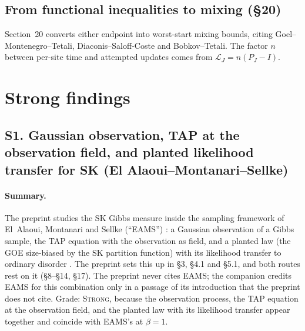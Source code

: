 \documentclass[11pt]{article}
\newcommand{\Lgen}{\mathcal{L}}
\newcommand{\ploc}[2]{#1}
\newcommand{\sloc}[2]{\cite[#2]{#1}}
\newcommand{\grade}[1]{\textsc{#1}}
\begin{document}
\subsection{From functional inequalities to mixing (\S20)}

Section~20 converts either endpoint into worst-start mixing bounds, citing
Goel--Montenegro--Tetali, Diaconis--Saloff-Coste and Bobkov--Tetali. The factor
$n$ between per-site time and attempted updates comes from $\Lgen_J=n(P_J-I)$.

\section{Strong findings}\label{sec:strong}
\subsection{S1. Gaussian observation, TAP at the observation field, and planted likelihood transfer for SK (El Alaoui--Montanari--Sellke)}\label{f:S1}

\paragraph{Summary.}
The preprint \cite{OAI-CriticalMixing} studies the SK Gibbs measure inside the
sampling framework of El~Alaoui, Montanari and Sellke (``EAMS'')
\cite{ElAlaouiMontanariSellke2022-SamplingSKAlgorithmicSL}: a Gaussian
observation of a Gibbs sample, the TAP equation with the observation as field,
and a planted law (the GOE size-biased by the SK partition function) with its
likelihood transfer to ordinary disorder
\sloc{ElAlaouiMontanariSellke2022-SamplingSKAlgorithmicSL}{(1.4), (4.12); (2.3), (4.53); \S4.1, Proposition~4.2, (4.14)}.
The preprint sets this up in \ploc{\S3, \S4.1 and \S5.1}{accepted-inputs.tex:17--30; proof-overview.tex:47--50; profile-spectral.tex:31--48},
and both routes rest on it (\S8--\S14, \S17). The preprint never cites EAMS;
the companion credits EAMS for this combination only in a passage of its
introduction \sloc{OAI-AcceptedGap}{\S1, p.~4} that the preprint does not
cite. Grade: \grade{Strong}, because the observation process, the TAP equation
at the observation field, and the planted law with its likelihood transfer
appear together and coincide with EAMS's at $\beta=1$.
\end{document}
